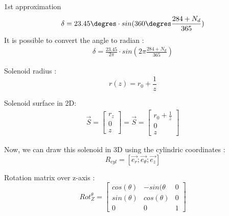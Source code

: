 \documentclass[12pt,a4paper]{article}
\begin{document}
1st approximation
\begin{eqnarray}
\delta = 23.45 \degres \cdot sin(360 \degres \frac{284+N_d}{365})
\end{eqnarray}
It is possible to convert the angle to radian : 
\begin{eqnarray}
	\delta = \frac{23.45}{2 \pi} \cdot sin(2 \pi \frac{284+N_d}{365})
\end{eqnarray}

\newpage
Solenoid radius : 
\begin{equation}
r(z)=r_0 + \frac{1}{z}
\end{equation}
\begin{center}
\end{center}
Solenoid surface in 2D: 
\begin{eqnarray}
\vec{S}=\begin{bmatrix}
r_z \\
0\\
z
\end{bmatrix} = 
\vec{S}=\begin{bmatrix}
r_0 + \frac{1}{z} \\
0\\
z
\end{bmatrix}
\end{eqnarray}


Now, we can draw this solenoid in 3D using the cylindric coordinates : 
\begin{equation}
R_{cyl}=[\vec{e_r};\vec{e_{\theta}};\vec{e_z}]
\end{equation}

Rotation matrix over z-axis : 
\begin{equation}
Rot_Z^{\theta}=
\begin{bmatrix}
cos(\theta) & -sin(\theta & 0\\
sin(\theta) & cos(\theta) & 0\\
0 & 0 & 1
\end{bmatrix}
\end{equation}
\end{document}
